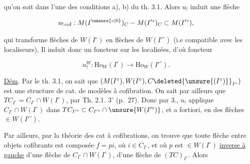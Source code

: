 
qu'on soit  dans l'une des conditions a), b) du th. 3.1. Alors $u_!$ induit une flèche

\[
 u_{!\,\mathrm{cof}}:M(I^{\unsure{\circ|0}})_C\mathbin{-} M(I'^\circ)_C\subset M(I'^\circ),
\]

qui transforme flèches de $W(I^\circ)$ en flèches de $W(I'^\circ)$ (i.e compatible avec les localiseurs), Il induit donc un foncteur sur les localisées, d'où    foncteur 

\[
 u_!^W:\mathrm{Ho}_W(I^\circ)\longrightarrow\mathrm{Ho}_W(I'^\circ).\tag*{(3.3.1)}
\]


\uline{Dém}. Par le th. 3.1, on sait que $(M(I^\circ),W(I^\circ),C\deleted{\unsure{(I^\circ)}}_{I^\circ})$ est une structure de cat. de modèles à cofibration. On sait par ailleurs que $TC_{I^\circ}=C_{I^\circ}\cap W(I^\circ)$, par Th. 2.1. $3^\circ$ (p.~27). Donc par 3., $u_!$ applique $C_{I^\circ}\cap W(I^\circ)$ dans $TC_{I'^\circ}\subset C_{I'^\circ}\cap\unsure{W(I'^\circ)}$, et a fortiori, en des flèches $\in W(I'^\circ)$.

Par ailleurs, par la théorie des cat à cofibrations, on trouve que toute flèche   entre objets cofibrants est composée $f=pi$, où $i\in C_{I^\circ}$, et  où $p$ est $\in W(I^\circ)$  \uline{inverse à gauche} d'une flèche de $C_{I^\circ}\cap W(I^\circ)$,  d'une flèche de $(TC)_{I^\circ}$. Alors
